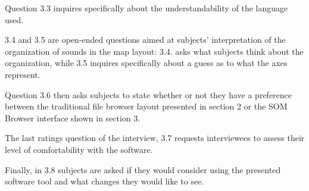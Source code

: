 \par
Question 3.3 inquires specifically about the understandability of the
language used.

\par
3.4 and 3.5 are open-ended questions aimed at subjects'
interpretation of the organization of sounds in the map layout: 3.4. asks what
subjects think about the organization, while 3.5 inquires specifically about
a guess as to what the axes represent.

\par
Question 3.6 then asks subjects to state whether or not they have a preference
between the traditional file browser layout presented in section 2 or the SOM
Browser interface shown in section 3.

\par
The last ratings question of the interview, 3.7 requests interviewees to assess
their level of comfortability with the software.

\par
Finally, in 3.8 subjects are asked if they would consider using the presented
software tool and what changes they would like to see.
